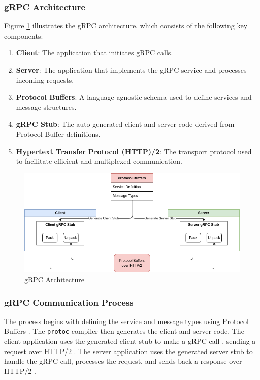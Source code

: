 \subsubsection{gRPC Architecture}

Figure \ref{fig:grpc} illustrates the gRPC architecture, which consists of the following key components:
\begin{enumerate}
    \item \textbf{Client}: The application that initiates gRPC calls.
    \item \textbf{Server}: The application that implements the gRPC service and processes incoming requests.
    \item \textbf{Protocol Buffers}: A language-agnostic schema used to define services and message structures.
    \item \textbf{gRPC Stub}: The auto-generated client and server code derived from Protocol Buffer definitions.
    \item \textbf{Hypertext Transfer Protocol (HTTP)/2}: The transport protocol used to facilitate efficient and multiplexed communication.
\end{enumerate}

\begin{figure}[H]
    \centering
    \includegraphics[width=\textwidth]{figures/gRPC_architecture.drawio.png}
    \caption{gRPC Architecture}
    \label{fig:grpc}
\end{figure}

\subsubsection{gRPC Communication Process}
The process begins with defining the service and message types using Protocol Buffers \cite{protocol_buffers_overview}. The \texttt{protoc} compiler then generates the client and server code. The client application uses the generated client stub to make a gRPC call \cite{grpc_api}, sending a request over HTTP/2 \cite{grpc_http2}. The server application uses the generated server stub to handle the gRPC call, processes the request, and sends back a response over HTTP/2 \cite{grpc_api}.


